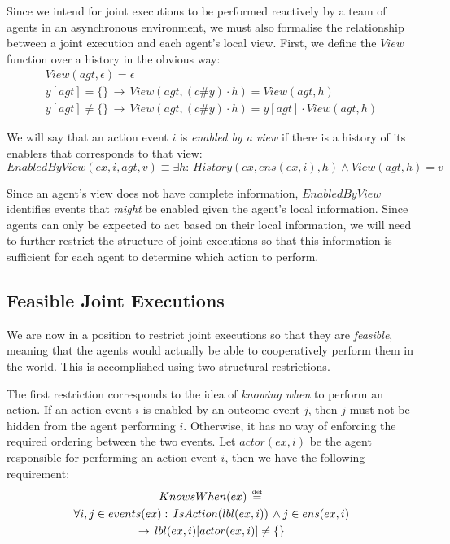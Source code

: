 Since we intend for joint executions to be performed reactively by
a team of agents in an asynchronous environment, we must also formalise
the relationship between a joint execution and each agent's local
view. First, we define the $View$ function over a history in the
obvious way:\begin{gather*}
View(agt,\epsilon)=\epsilon\\
y[agt]=\{\}\,\rightarrow\, View(agt,(c\#y)\cdot h)=View(agt,h)\\
y[agt]\neq\{\}\,\rightarrow\, View(agt,(c\#y)\cdot h)=y[agt]\cdot View(agt,h)\end{gather*}


We will say that an action event $i$ is \emph{enabled by a view}
if there is a history of its enablers that corresponds to that view:
\[
EnabledByView(ex,i,agt,v)\equiv\exists h:\, History(ex,ens(ex,i),h)\wedge View(agt,h)=v\]


Since an agent's view does not have complete information, $EnabledByView$
identifies events that \emph{might} be enabled given the agent's local
information. Since agents can only be expected to act based on their
local information, we will need to further restrict the structure
of joint executions so that this information is sufficient for each
agent to determine which action to perform.


\subsection{Feasible Joint Executions}

We are now in a position to restrict joint executions so that they
are \emph{feasible}, meaning that the agents would actually be able
to cooperatively perform them in the world. This is accomplished using
two structural restrictions.

The first restriction corresponds to the idea of \emph{knowing when}
to perform an action. If an action event $i$ is enabled by an outcome
event $j$, then $j$ must not be hidden from the agent performing
$i$. Otherwise, it has no way of enforcing the required ordering
between the two events. Let $actor(ex,i)$ be the agent responsible
for performing an action event $i$, then we have the following requirement:\begin{multline*}
KnowsWhen(ex)\,\stackrel{\mbox{\tiny def}}{=}\,\\
\forall i,j\in events(ex):\, IsAction(lbl(ex,i))\,\wedge j\in ens(ex,i)\\
\rightarrow\, lbl(ex,i)[actor(ex,i)]\neq\{\}\end{multline*}


